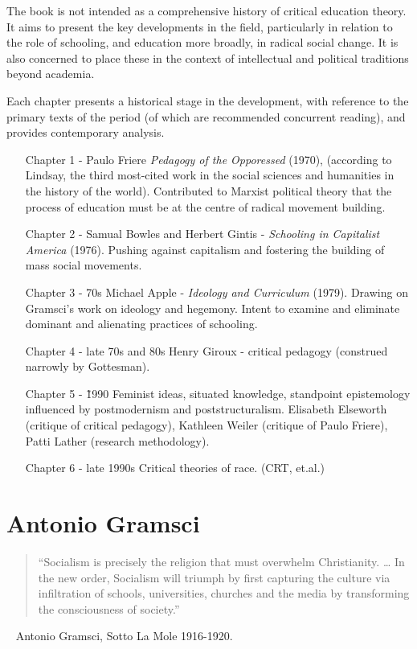 \documentclass[10pt,titlepage]{book}
\begin{document}
The book is not intended as a comprehensive history of critical education theory.
It aims to present the key developments in the field, particularly in relation to the role of schooling, and education more broadly, in radical social change.
It is also concerned to place these in the context of intellectual and political traditions beyond academia.

Each chapter presents a historical stage in the development, with reference to the primary texts of the period (of which are recommended concurrent reading), and provides contemporary analysis.

\begin{itemize}
\item [Chapter 1 -]
  Paulo Friere \emph{Pedagogy of the Opporessed} (1970), (according to Lindsay, the third most-cited work in the social sciences and humanities in the history of the world).
  Contributed to Marxist political theory that the process of education must be at the centre of radical movement building.
\item [Chapter 2 -]
  Samual Bowles and Herbert Gintis - \emph{Schooling in Capitalist America} (1976).
  Pushing against capitalism and fostering the building of mass social movements.
\item [Chapter 3 - 70s]
  Michael Apple - \emph{Ideology and Curriculum} (1979).  Drawing on Gramsci's work on ideology and hegemony.
  Intent to examine and eliminate dominant and alienating practices of schooling.
\item [Chapter 4 - late 70s and 80s]
  Henry Giroux - critical pedagogy (construed narrowly by Gottesman).
\item [Chapter 5 - \~1990]
  Feminist ideas, situated knowledge, standpoint epistemology influenced by postmodernism and poststructuralism.
  Elisabeth Elseworth (critique of critical pedagogy), Kathleen Weiler (critique of Paulo Friere), Patti Lather (research methodology).
\item [Chapter 6 - late 1990s]
  Critical theories of race. (CRT, et.al.)
\end{itemize}

\pagebreak

\section{Antonio Gramsci}

\begin{quotation}“Socialism is precisely the religion that must overwhelm Christianity. … In the new order, Socialism will triumph by first capturing the culture via infiltration of schools, universities, churches and the media by transforming the consciousness of society.”
  \end{quotation}
~ Antonio Gramsci, Sotto La Mole 1916-1920.
\end{document}
